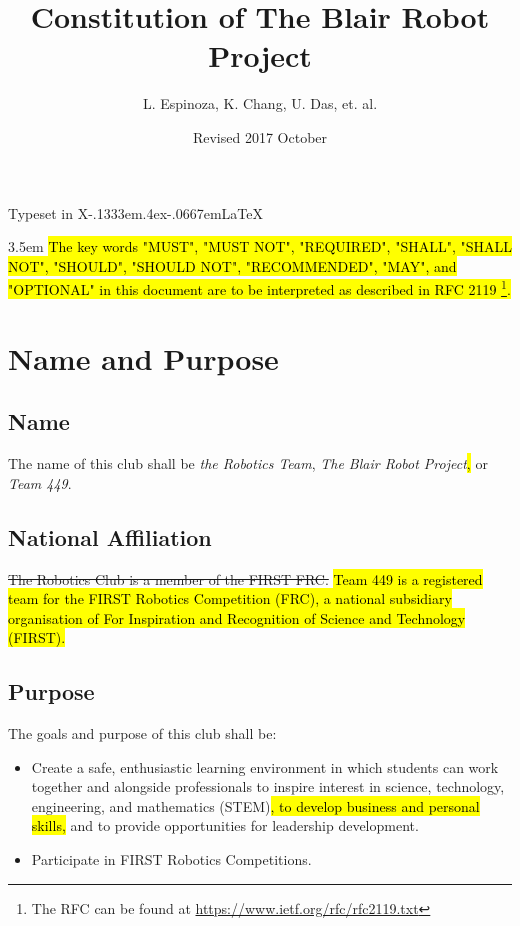 \documentclass[12pt, a4paper]{article}
\title{Constitution of The Blair Robot Project}
\author{L. Espinoza, K. Chang, U. Das, et. al.}
\affil{Montgomery Blair High School\\ Silver Spring, Maryland}
\date{Revised 2017 October}
\begin{document}
\maketitle
\thispagestyle{empty}
\begin{center}
Typeset in X\kern-.1333em\lower.4ex\hbox{}\kern-.0667em\LaTeX \hspace{.3em}%
\end{center}
\clearpage
\begin{center}
\begingroup
\leftskip3.5em
\rightskip\leftskip
\hl{
The key words "MUST", "MUST NOT", "REQUIRED", "SHALL", "SHALL
      NOT", "SHOULD", "SHOULD NOT", "RECOMMENDED",  "MAY", and
      "OPTIONAL" in this document are to be interpreted as described in
      RFC 2119 \footnote{The RFC can be found at \url{https://www.ietf.org/rfc/rfc2119.txt}}.}
\par
\endgroup
\end{center}
\section{Name and Purpose}
\subsection{Name}
The name of this club shall be \textit{the Robotics Team}, \textit{The Blair Robot Project}\hl{,} or \textit{Team 449}.
\subsection{National Affiliation}
\st{The Robotics Club is a member of the FIRST FRC.} \hl{Team 449 is a registered team for the FIRST Robotics Competition (FRC), a national subsidiary organisation of For Inspiration and Recognition of Science and Technology (FIRST).} 
\subsection{Purpose}
The goals and purpose of this club shall be:
\begin{itemize}
\item Create a safe, enthusiastic learning environment in which students can work together and alongside professionals to inspire interest in science, technology, engineering, and mathematics (STEM)\hl{, to develop business and personal skills,} and to provide opportunities for leadership development.
\item Participate in FIRST Robotics Competitions.
\end{itemize}
\end{document}
